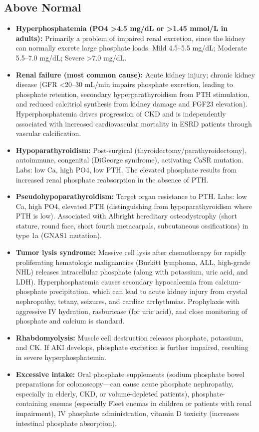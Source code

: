 \subsection*{Above Normal}
\begin{itemize}
  \item \textbf{Hyperphosphatemia (PO4 >4.5 mg/dL or >1.45 mmol/L in adults):} Primarily a problem of impaired renal excretion, since the kidney can normally excrete large phosphate loads. Mild 4.5--5.5 mg/dL; Moderate 5.5--7.0 mg/dL; Severe >7.0 mg/dL.
  \item \textbf{Renal failure (most common cause):} Acute kidney injury; chronic kidney disease (GFR <20--30 mL/min impairs phosphate excretion, leading to phosphate retention, secondary hyperparathyroidism from PTH stimulation, and reduced calcitriol synthesis from kidney damage and FGF23 elevation). Hyperphosphatemia drives progression of CKD and is independently associated with increased cardiovascular mortality in ESRD patients through vascular calcification.
  \item \textbf{Hypoparathyroidism:} Post-surgical (thyroidectomy/parathyroidectomy), autoimmune, congenital (DiGeorge syndrome), activating CaSR mutation. Labs: low Ca, high PO4, low PTH. The elevated phosphate results from increased renal phosphate reabsorption in the absence of PTH.
  \item \textbf{Pseudohypoparathyroidism:} Target organ resistance to PTH. Labs: low Ca, high PO4, elevated PTH (distinguishing from hypoparathyroidism where PTH is low). Associated with Albright hereditary osteodystrophy (short stature, round face, short fourth metacarpals, subcutaneous ossifications) in type 1a (GNAS1 mutation).
  \item \textbf{Tumor lysis syndrome:} Massive cell lysis after chemotherapy for rapidly proliferating hematologic malignancies (Burkitt lymphoma, ALL, high-grade NHL) releases intracellular phosphate (along with potassium, uric acid, and LDH). Hyperphosphatemia causes secondary hypocalcemia from calcium-phosphate precipitation, which can lead to acute kidney injury from crystal nephropathy, tetany, seizures, and cardiac arrhythmias. Prophylaxis with aggressive IV hydration, rasburicase (for uric acid), and close monitoring of phosphate and calcium is standard.
  \item \textbf{Rhabdomyolysis:} Muscle cell destruction releases phosphate, potassium, and CK. If AKI develops, phosphate excretion is further impaired, resulting in severe hyperphosphatemia.
  \item \textbf{Excessive intake:} Oral phosphate supplements (sodium phosphate bowel preparations for colonoscopy---can cause acute phosphate nephropathy, especially in elderly, CKD, or volume-depleted patients), phosphate-containing enemas (especially Fleet enemas in children or patients with renal impairment), IV phosphate administration, vitamin D toxicity (increases intestinal phosphate absorption).

\end{itemize}
